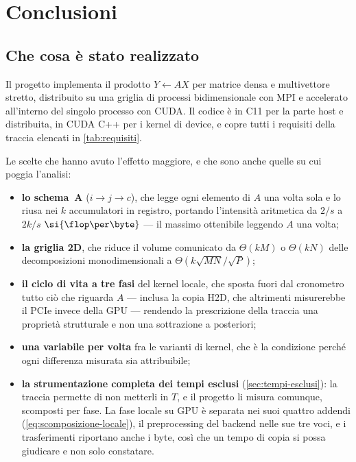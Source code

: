 \chapter{Conclusioni}
\label{cap:conclusioni}

\section{Che cosa \`e stato realizzato}

Il progetto implementa il prodotto $Y \leftarrow AX$ per matrice densa e
multivettore stretto, distribuito su una griglia di processi bidimensionale con
MPI e accelerato all'interno del singolo processo con CUDA. Il codice \`e in C11
per la parte host e distribuita, in CUDA C++ per i kernel di device, e copre
tutti i requisiti della traccia elencati in \cref{tab:requisiti}.

Le scelte che hanno avuto l'effetto maggiore, e che sono anche quelle su cui
poggia l'analisi:

\begin{itemize}[nosep,left=0pt]
  \item \textbf{lo schema~A} ($i \to j \to c$), che legge ogni elemento di $A$
        una volta sola e lo riusa nei $k$ accumulatori in registro, portando
        l'intensit\`a aritmetica da $2/s$ a $2k/s$
        $\si{\flop\per\byte}$ --- il massimo ottenibile leggendo $A$ una volta;
  \item \textbf{la griglia 2D}, che riduce il volume comunicato da $\Theta(kM)$
        o $\Theta(kN)$ delle decomposizioni monodimensionali a
        $\Theta(k\sqrt{MN}/\sqrt{P})$;
  \item \textbf{il ciclo di vita a tre fasi} del kernel locale, che sposta fuori
        dal cronometro tutto ci\`o che riguarda $A$ --- inclusa la copia H2D, che
        altrimenti misurerebbe il PCIe invece della GPU --- rendendo la
        prescrizione della traccia una propriet\`a strutturale e non una
        sottrazione a posteriori;
  \item \textbf{una variabile per volta} fra le varianti di kernel, che \`e la
        condizione perch\'e ogni differenza misurata sia attribuibile;
  \item \textbf{la strumentazione completa dei tempi esclusi}
        (\cref{sec:tempi-esclusi}): la traccia permette di non metterli in $T$,
        e il progetto li misura comunque, scomposti per fase. La fase locale su
        GPU \`e separata nei suoi quattro addendi
        (\cref{eq:scomposizione-locale}), il preprocessing del backend nelle sue
        tre voci, e i trasferimenti riportano anche i byte, cos\`i che un tempo di
        copia si possa giudicare e non solo constatare.
\end{itemize}

